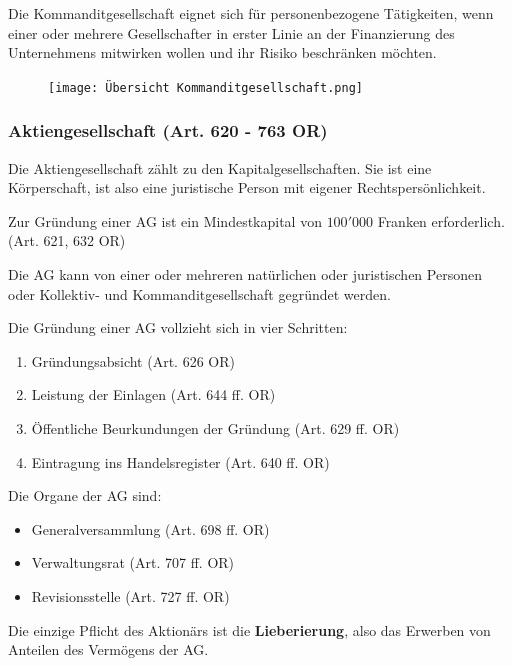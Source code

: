 \documentclass[12pt]{article}
\begin{document}
Die Kommanditgesellschaft eignet sich für personenbezogene Tätigkeiten, wenn einer oder mehrere Gesellschafter in erster Linie an der Finanzierung des Unternehmens mitwirken wollen und ihr Risiko beschränken möchten.
\begin{figure}[h]
    \begin{center}
            \texttt{[image: Übersicht Kommanditgesellschaft.png]}
    \end{center}
\end{figure}

\subsubsection{Aktiengesellschaft (Art. 620 - 763 OR)}
Die Aktiengesellschaft zählt zu den Kapitalgesellschaften. Sie ist eine Körperschaft, ist also eine juristische Person mit eigener Rechtspersönlichkeit.

Zur Gründung einer AG ist ein Mindestkapital von $100'000$ Franken erforderlich. (Art. 621, 632 OR)

Die AG kann von einer oder mehreren natürlichen oder juristischen Personen oder Kollektiv- und Kommanditgesellschaft gegründet werden.

Die Gründung einer AG vollzieht sich in vier Schritten:

\begin{enumerate}
    \item Gründungsabsicht (Art. 626 OR)
    \item Leistung der Einlagen (Art. 644 ff. OR)
    \item Öffentliche Beurkundungen der Gründung (Art. 629 ff. OR)
    \item Eintragung ins Handelsregister (Art. 640 ff. OR)
\end{enumerate}
Die Organe der AG sind:
\begin{itemize}
    \item Generalversammlung (Art. 698 ff. OR)
    \item Verwaltungsrat (Art. 707 ff. OR)
    \item Revisionsstelle (Art. 727 ff. OR)
\end{itemize}
Die einzige Pflicht des Aktionärs ist die \textbf{Lieberierung}, also das Erwerben von Anteilen des Vermögens der AG.
\end{document}
